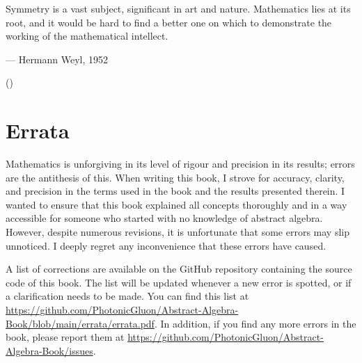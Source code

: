 \vspace*{1.5cm}

\begin{center}
    \parbox{10cm}{
        \Large
        Symmetry is a vast subject, significant in art and nature. Mathematics lies at its root, and it would be hard to find a better one on which to demonstrate the working of the mathematical intellect.
        \vspace{0.3cm}

        \hfill
        --- Hermann Weyl, 1952\\
        \vspace{-0.7cm}

        \hfill
        \normalsize
        ({\cite[p.~145]{weyl_1952}})
    }
\end{center}

\vspace*{\fill}

\begin{center}
    \fontsize{8pt}{8pt}\selectfont
\end{center}

\vspace*{2\baselineskip}
\cleardoublepage

\createtoc

\chapter{Errata}
Mathematics is unforgiving in its level of rigour and precision in its results; errors are the antithesis of this. When writing this book, I strove for accuracy, clarity, and precision in the terms used in the book and the results presented therein. I wanted to ensure that this book explained all concepts thoroughly and in a way accessible for someone who started with no knowledge of abstract algebra. However, despite numerous revisions, it is unfortunate that some errors may slip unnoticed. I deeply regret any inconvenience that these errors have caused.

A list of corrections are available on the GitHub repository containing the source code of this book. The list will be updated whenever a new error is spotted, or if a clarification needs to be made. You can find this list at \url{https://github.com/PhotonicGluon/Abstract-Algebra-Book/blob/main/errata/errata.pdf}. In addition, if you find any more errors in the book, please report them at \url{https://github.com/PhotonicGluon/Abstract-Algebra-Book/issues}.

